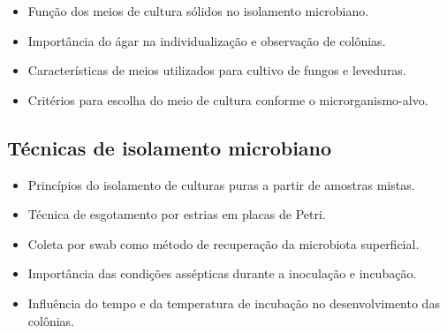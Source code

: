 \begin{itemize}
    \item Função dos meios de cultura sólidos no isolamento microbiano.
    \item Importância do ágar na individualização e observação de colônias.
    \item Características de meios utilizados para cultivo de fungos e leveduras.
    \item Critérios para escolha do meio de cultura conforme o microrganismo-alvo.
\end{itemize}

\subsection{Técnicas de isolamento microbiano}

\begin{itemize}
    \item Princípios do isolamento de culturas puras a partir de amostras mistas.
    \item Técnica de esgotamento por estrias em placas de Petri.
    \item Coleta por swab como método de recuperação da microbiota superficial.
    \item Importância das condições assépticas durante a inoculação e incubação.
    \item Influência do tempo e da temperatura de incubação no desenvolvimento das colônias.
\end{itemize}
